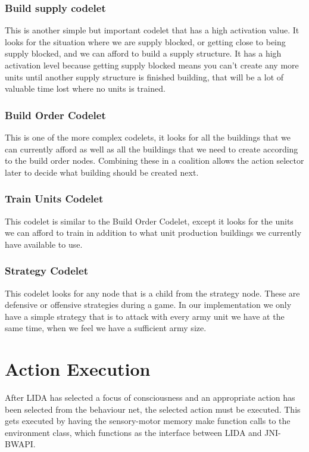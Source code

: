 \subsubsection{Build supply codelet}
This is another simple but important codelet that has a high activation value. It looks for the situation where we are supply blocked, or getting close to being supply blocked, and we can afford to build a supply structure. It has a high activation level because getting supply blocked means you can't create any more units until another supply structure is finished building, that will be a lot of valuable time lost where no units is trained.

\subsubsection{Build Order Codelet}
This is one of the more complex codelets, it looks for all the buildings that we can currently afford as well as all the buildings that we need to create according to the build order nodes. Combining these in a coalition allows the action selector later to decide what building should be created next. 

\subsubsection{Train Units Codelet}
This codelet is similar to the Build Order Codelet, except it looks for the units we can afford to train in addition to what unit production buildings we currently have available to use. 

\subsubsection{Strategy Codelet}
This codelet looks for any node that is a child from the strategy node. These are defensive or offensive strategies during a game. In our implementation we only have a simple strategy that is to attack with every army unit we have at the same time, when we feel we have a sufficient army size.

\section{Action Execution}
\label{sec:actionexecution}
After LIDA has selected a focus of consciousness and an appropriate action has been selected from the behaviour net, the selected action must be executed. This gets executed by having the sensory-motor memory make function calls to the environment class, which functions as the interface between LIDA and JNI-BWAPI. 


